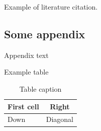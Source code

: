 \documentclass[12pt,oneside]{book}
\begin{document}
Example of literature citation\cite{petrasinovic22}.
 
\pagestyle{listing}

\cleardoublepage
{}
{} 
\printbibliography

\begin{appendices}

\chapter{Some appendix}
Appendix text

Example table

\begin{table}[H]
\large
\centering
\caption{Table caption}
\begin{tabular}[H]{|l|c|}
\hline
First cell & Right \\ \hline
Down & Diagonal \\ \hline
\end{tabular}
\end{table}

\end{appendices}

\printindex 

\end{document}
